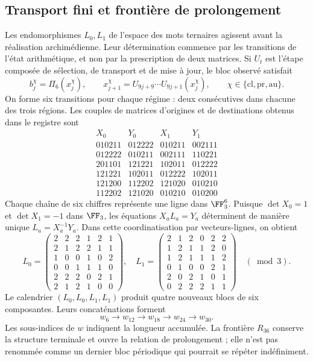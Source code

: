 \subsection{Transport fini et frontière de prolongement}

Les endomorphismes \(L_0,L_1\) de l'espace des mots ternaires agissent avant la réalisation archimédienne. Leur détermination commence par les transitions de l'état arithmétique, et non par la prescription de deux matrices. Si \(U_t\) est l'étape composée de sélection, de transport et de mise à jour, le bloc observé satisfait
\[
 b_j^\chi=\Pi_6(x_j^\chi),\qquad
 x_{j+1}^\chi=U_{9j+9}\cdots U_{9j+1}(x_j^\chi),
 \qquad \chi\in\{\mathrm{cl},\mathrm{pr},\mathrm{au}\}.
\]
On forme six transitions pour chaque régime : deux consécutives dans chacune des trois régions. Les couples de matrices d'origines et de destinations obtenus dans le registre sont
\[
\begin{array}{c|c|c|c}
X_0&Y_0&X_1&Y_1\\\hline
010211&012222&010211&002111\\
012222&010211&002111&110221\\
201101&121221&102011&012222\\
121221&102011&012222&102011\\
121200&112202&121020&010210\\
112202&121020&010210&010200
\end{array}
\]
Chaque chaîne de six chiffres représente une ligne dans \(\FF_3^6\). Puisque \(\det X_0=1\) et \(\det X_1=-1\) dans \(\FF_3\), les équations \(X_aL_a=Y_a\) déterminent de manière unique \(L_a=X_a^{-1}Y_a\). Dans cette coordinatisation par vecteurs-lignes, on obtient
\[
 L_0=\begin{pmatrix}
 2&2&2&1&2&1\\2&1&2&2&1&1\\1&0&0&1&0&2\\
 0&0&1&1&1&0\\2&2&2&0&2&1\\2&1&2&1&0&0
 \end{pmatrix},\quad
 L_1=\begin{pmatrix}
 2&1&2&0&2&2\\1&2&1&1&2&0\\1&2&1&1&1&2\\
 0&1&0&0&2&1\\2&0&2&1&0&1\\0&2&2&2&1&1
 \end{pmatrix}\quad(\bmod3).
\]
Le calendrier \((L_0,L_0,L_1,L_1)\) produit quatre nouveaux blocs de six composantes. Leurs concaténations forment
\[
 w_6\longrightarrow w_{12}\longrightarrow w_{18}
 \longrightarrow w_{24}\longrightarrow w_{30}.
\]
Les sous-indices de \(w\) indiquent la longueur accumulée. La frontière \(R_{36}\) conserve la structure terminale et ouvre la relation de prolongement ; elle n'est pas renommée comme un dernier bloc périodique qui pourrait se répéter indéfiniment.

